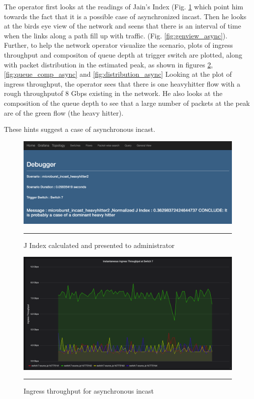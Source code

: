 	The operator first looks at the readings of Jain's Index (Fig. \ref{fig:jind_async} which point him towards the fact that it is a possible
	case of asynchronized incast.
	Then he looks at the birds eye view of the network and seens that there is an interval of time when the links along a path fill up
	with traffic. (Fig. \ref{fig:genview_async}).
	Further, to help the network operator visualize the scenario, plots of ingress throughput and compositon of queue depth at 
	trigger switch are plotted, along with packet distribution in the estimated peak, as shown in figures \ref{fig:ing_throughput_async}, \ref{fig:queue_comp_async}
	and \ref{fig:distribution_async}
	Looking at the plot of ingress throughput, the operator sees that there is one heavyhitter flow with a rough throughputof 8 Gbps existing in the network.
	He also looks at the composition of the queue depth to see that a large number of packets at the peak are of the green flow (the heavy hitter).

	These hints suggest a case of asynchronous incast.

	\begin{figure}[htbp]
		\centering
			\includegraphics[width=1.0\columnwidth]{Figures/jindex_async.png}
			\rule{35em}{0.5pt}
		\caption[Debugger Home Page, Asynchronous Incast]{J Index calculated and presented to administrator}
		\label{fig:jind_async}
	\end{figure}

\begin{figure}[htbp]
	\centering
		\includegraphics[width=1.0\columnwidth]{Figures/ing_thpt_async.png}
		\rule{35em}{0.5pt}
	\caption[Ingress Throughput Asynchronous Incast]{Ingress throughput for asynchronous incast}
	\label{fig:ing_throughput_async}
\end{figure}

